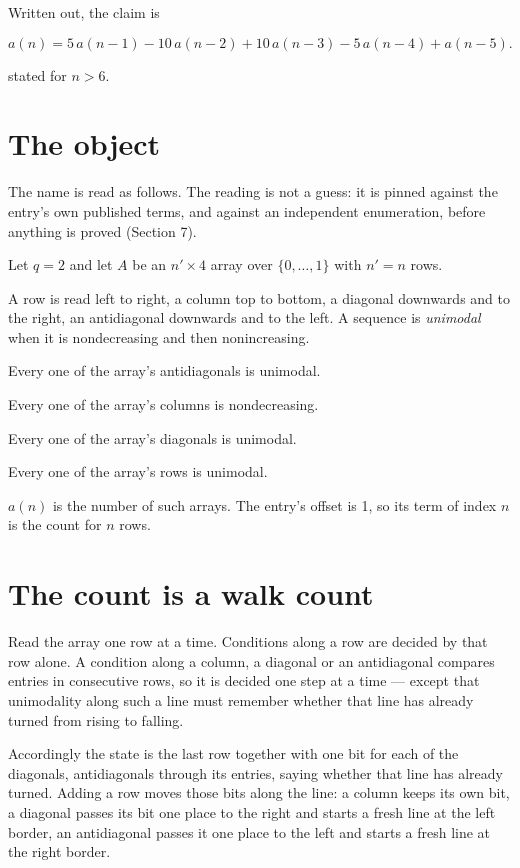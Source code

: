 \documentclass[11pt]{article}
\theoremstyle{definition}
\begin{document}
Written out, the claim is

\[a(n) = 5\,a(n-1) - 10\,a(n-2) + 10\,a(n-3) - 5\,a(n-4) + a(n-5).\]

stated for $n > 6$.

\section{The object}

The name is read as follows. The reading is not a guess: it is pinned against the entry's own published terms, and against an independent enumeration, before anything is proved (Section 7).

Let $q = 2$ and let $A$ be an $n' \times 4$ array over $\{0,\dots,1\}$ with $n' = n$ rows.

A row is read left to right, a column top to bottom, a diagonal downwards and to the right, an antidiagonal downwards and to the left. A sequence is {\itshape unimodal} when it is nondecreasing and then nonincreasing.

Every one of the array's antidiagonals is unimodal.

Every one of the array's columns is nondecreasing.

Every one of the array's diagonals is unimodal.

Every one of the array's rows is unimodal.

$a(n)$ is the number of such arrays. The entry's offset is 1, so its term of index $n$ is the count for $n$ rows.

\section{The count is a walk count}

Read the array one row at a time. Conditions along a row are decided by that row alone. A condition along a column, a diagonal or an antidiagonal compares entries in consecutive rows, so it is decided one step at a time --- except that unimodality along such a line must remember whether that line has already turned from rising to falling.

Accordingly the state is the last row together with one bit for each of the diagonals, antidiagonals through its entries, saying whether that line has already turned. Adding a row moves those bits along the line: a column keeps its own bit, a diagonal passes its bit one place to the right and starts a fresh line at the left border, an antidiagonal passes it one place to the left and starts a fresh line at the right border.
\end{document}
